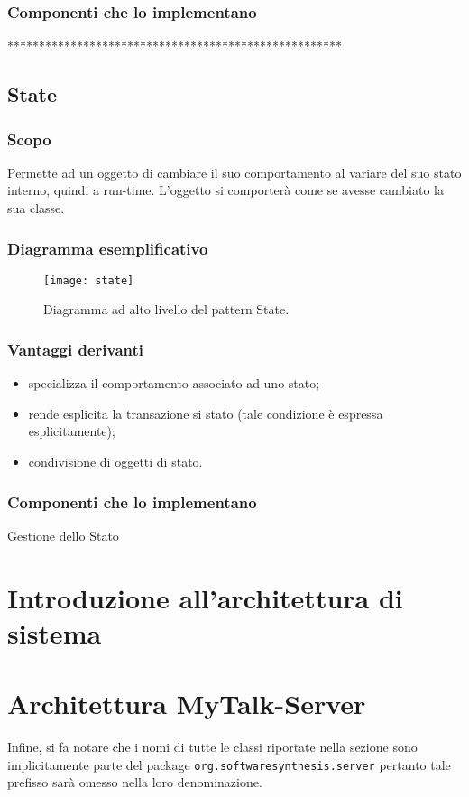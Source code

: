 \subsubsection{Componenti che lo implementano}
\item ******************************************************

\subsection{State}
\subsubsection{Scopo}
Permette ad un oggetto di cambiare il suo comportamento al variare del suo stato interno, quindi a run-time. L'oggetto si comporterà come se avesse cambiato la sua classe.
\subsubsection{Diagramma esemplificativo}
\begin{figure}[h]
\centering
\texttt{[image: state]}
\caption{Diagramma ad alto livello del pattern State.}\label{fig:state}
\end{figure}
\subsubsection{Vantaggi derivanti}
\begin{itemize}
\item specializza il comportamento associato ad uno stato;
\item rende esplicita la transazione si stato (tale condizione è espressa esplicitamente);
\item condivisione di oggetti di stato.
\end{itemize}
\subsubsection{Componenti che lo implementano}
\item Gestione dello Stato
\clearpage

\section{Introduzione all'architettura di sistema}
\clearpage

\section{Architettura MyTalk-Server}
Infine, si fa notare che i nomi di tutte le classi riportate nella sezione sono implicitamente parte del package \texttt{org.softwaresynthesis.server} pertanto tale prefisso sarà omesso nella loro denominazione.


